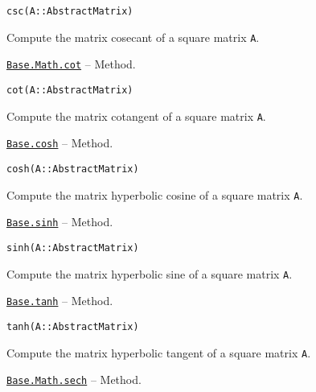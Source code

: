 \begin{adjustwidth}{2em}{0pt}


\begin{verbatim}
csc(A::AbstractMatrix)
\end{verbatim}

Compute the matrix cosecant of a square matrix \texttt{A}.



\end{adjustwidth}
\hypertarget{6964020415457038393}{}
\hyperlink{6964020415457038393}{\texttt{Base.Math.cot}}  -- {Method.}

\begin{adjustwidth}{2em}{0pt}


\begin{verbatim}
cot(A::AbstractMatrix)
\end{verbatim}

Compute the matrix cotangent of a square matrix \texttt{A}.



\end{adjustwidth}
\hypertarget{5522306896915645280}{}
\hyperlink{5522306896915645280}{\texttt{Base.cosh}}  -- {Method.}

\begin{adjustwidth}{2em}{0pt}


\begin{verbatim}
cosh(A::AbstractMatrix)
\end{verbatim}

Compute the matrix hyperbolic cosine of a square matrix \texttt{A}.



\end{adjustwidth}
\hypertarget{17573327119706849626}{}
\hyperlink{17573327119706849626}{\texttt{Base.sinh}}  -- {Method.}

\begin{adjustwidth}{2em}{0pt}


\begin{verbatim}
sinh(A::AbstractMatrix)
\end{verbatim}

Compute the matrix hyperbolic sine of a square matrix \texttt{A}.



\end{adjustwidth}
\hypertarget{4869557730435752421}{}
\hyperlink{4869557730435752421}{\texttt{Base.tanh}}  -- {Method.}

\begin{adjustwidth}{2em}{0pt}


\begin{verbatim}
tanh(A::AbstractMatrix)
\end{verbatim}

Compute the matrix hyperbolic tangent of a square matrix \texttt{A}.



\end{adjustwidth}
\hypertarget{6885419493129369079}{}
\hyperlink{6885419493129369079}{\texttt{Base.Math.sech}}  -- {Method.}

